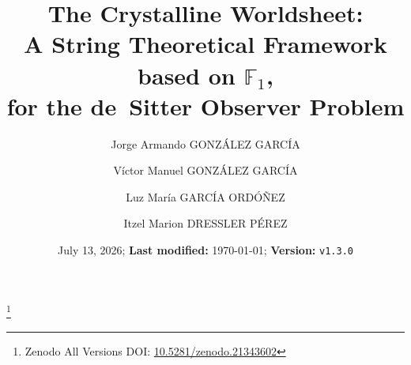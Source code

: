\documentclass[11pt,reqno]{amsart}
\numberwithin{equation}{section}
\theoremstyle{definition}
\theoremstyle{remark}
\newcommand{\F}{\mathbb{F}}
\begin{document}
\title[The Crystalline Worldsheet]
{The Crystalline Worldsheet:\\
    A String Theoretical Framework based on $\F_1$,\\
    for the de~Sitter Observer Problem}
\thanks{Zenodo All Versions DOI: \href{https://doi.org/10.5281/zenodo.21343602}{10.5281/zenodo.21343602}}

\author[J. A. González García et al.]{Jorge Armando GONZÁLEZ GARCÍA}
\author[]{Víctor Manuel GONZÁLEZ GARCÍA}
\author[]{Luz María GARCÍA ORDÓÑEZ}
\address{TTAMAYO PUNTO COM, S.A.P.I. de C.V.; Research \& Development Division; Naucalpan de Juárez, State of Mexico, Mexico}

\author[]{Itzel Marion DRESSLER PÉREZ}
\address{Independent Researcher}

\renewcommand{\datename}{\textbf{Received:}}
\date{July 13, 2026; \textbf{Last modified:} \today; \textbf{Version:} \texttt{v1.3.0}}



\maketitle



\tableofcontents

\pagebreak










\printbibliography
\end{document}
